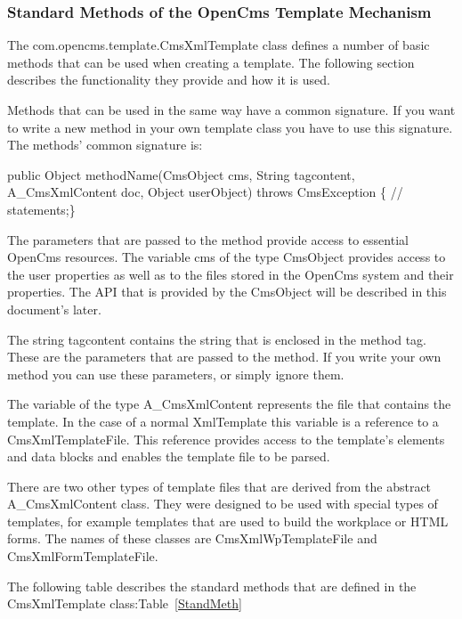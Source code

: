 \subsubsection{Standard Methods of the OpenCms Template Mechanism}
The {\class com.opencms.template.CmsXmlTemplate} class defines a number of basic
methods that can be used when creating a template. The following
section describes the functionality they provide and how it is used.

Methods that can be used in the same way have a common signature. If
you want to write a new method in your own template class you have to
use this signature. The methods' common signature is:

{\meth public Object methodName(CmsObject cms, String tagcontent,
A\_CmsXmlContent doc, Object userObject) throws CmsException \{
        // statements;\}}

The parameters that are passed to the method provide access to
essential OpenCms resources. The variable cms of the type {\code CmsObject}
provides access to the user properties as well as to the files stored
in the OpenCms system and their properties. The API that is provided by
the CmsObject will be described in this document's later.

The string tagcontent contains the string that is enclosed in the
method tag. These are the parameters that are passed to the method. If
you write your own method you can use these parameters, or simply
ignore them.

The variable of the type {\code A\_CmsXmlContent} represents the file that
contains the template. In the case of a normal XmlTemplate this
variable is a reference to a {\class CmsXmlTemplateFile}. This reference
provides access to the template's elements and data blocks and enables
the template file to be parsed.

There are two other types of template files that are derived from the
abstract\\
 {\class A\_CmsXmlContent} class. They were designed to be used with
special types of templates, for example templates that are used to
build the workplace or HTML forms. The names of these classes are
{\class CmsXmlWpTemplateFile} and {\class CmsXmlFormTemplateFile}.

The following table describes the standard methods that are defined in
the {\class CmsXmlTemplate} class:{Table~\ref{StandMeth}}


